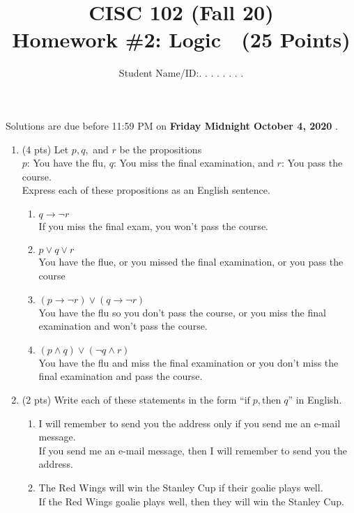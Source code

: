 \documentclass[12pt]{article}
\title{CISC 102 (Fall 20)\\ Homework \#2: Logic $\;$   (25 Points) }
\author{Student Name/ID:. . . . . . . .}
\date{}
\begin{document}
\maketitle

\par\noindent Solutions are due before 11:59 PM on \textbf{Friday  Midnight October 4, 2020 }.


\begin{enumerate}

\item (4 pts)
Let $p, q,$ and $r$ be the propositions\\
$p$: You have the flu, $q$: You miss the final examination, and $r$: You pass the course. \\
Express each of these propositions as an English sentence.
\begin{enumerate}
	\item 	$q \rightarrow  \neg r$
    \\If you miss the final exam, you won't pass the course.
	\item  $p \vee q \vee r$
    \\You have the flue, or you missed the final examination, or you pass the course
	\item $(p \rightarrow \neg r) \vee (q \rightarrow \neg r)$
    \\You have the flu so you don't pass the course, or you miss the final examination and won't pass the course.
	\item $(p \wedge q) \vee (\neg q \wedge r)$
    \\You have the flu and miss the final examination or you don't miss the final examination and pass the course.
\end{enumerate}	

\item (2 pts)
Write each of these statements in the form $\textrm{“if}\; p, \textrm{then}\; q”$
in English.
\begin{enumerate}
	\item I will remember to send you the address only if you send me an e-mail message.
\\If you send me an e-mail message, then I will remember to send you the address.\\
	
	\item The Red Wings will win the Stanley Cup if their 	goalie plays well.
\\If the Red Wings goalie plays well, then they will win the Stanley Cup.
\end{enumerate}


\end{enumerate}
\end{document}
